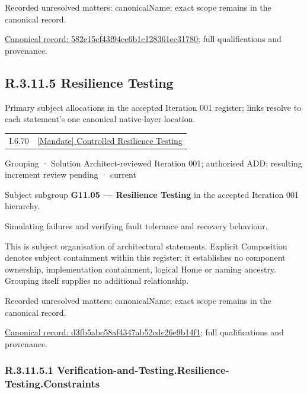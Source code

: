 {\small Recorded unresolved matters: canonicalName; exact scope remains in the canonical record.}\par
{\footnotesize \href{../../../../continuum/grouping/582e15cf43f94ce6b1c128361ec31780.md}{Canonical record: 582e15cf43f94ce6b1c128361ec31780}; full qualifications and provenance.}\par
\subsection*{R.3.11.5 Resilience Testing}
\label{navigation:R.3.11.5}

Primary subject allocations in the accepted Iteration 001 register; links resolve to each statement’s one canonical native-layer location.\par
\begin{longtable}{p{.22\linewidth}p{.73\linewidth}}
I.6.70 & \hyperref[element:f2d38e7beef84b61a769de4ca7f48951]{[Mandate] Controlled Resilience Testing} \\
\end{longtable}
\label{element:d3fb5abc58af4347ab52cdc26e9b14f1}
{\small Grouping · Solution Architect-reviewed Iteration 001; authorised ADD; resulting increment review pending · current}\par

Subject subgroup \textbf{G11.05 — Resilience Testing} in the accepted Iteration 001 hierarchy.



Simulating failures and verifying fault tolerance and recovery behaviour.



This is subject organisation of architectural statements. Explicit Composition denotes subject containment within this register; it establishes no component ownership, implementation containment, logical Home or naming ancestry. Grouping itself supplies no additional relationship.


{\small Recorded unresolved matters: canonicalName; exact scope remains in the canonical record.}\par
{\footnotesize \href{../../../../continuum/grouping/d3fb5abc58af4347ab52cdc26e9b14f1.md}{Canonical record: d3fb5abc58af4347ab52cdc26e9b14f1}; full qualifications and provenance.}\par
\subsubsection*{R.3.11.5.1 Verification-and-Testing.Resilience-Testing.Constraints}
\label{navigation:R.3.11.5.1}

